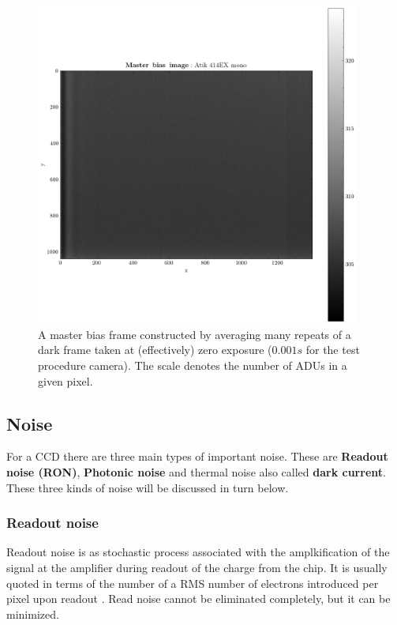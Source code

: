 \documentclass[../main.tex]{subfiles}
\begin{document}
	\begin{figure}[h!]
		\centering
		\includegraphics[width	=0.95\textwidth]{master_bias.png}
		\caption{A master bias frame constructed by averaging many repeats of a dark frame taken at (effectively) zero exposure ($0.001s$ for the test procedure camera). The scale denotes the number of ADUs in a given pixel.}
		\label{fig:masterbias}
	\end{figure}
	
	
	\subsection{Noise}
	For a CCD there are three main types of important noise. These are \textbf{Readout noise (RON)}, \textbf{Photonic noise} and thermal noise also called \textbf{dark current}. These three kinds of noise will be discussed in turn below. 
	
	\subsubsection{Readout noise}\label{ron}
	Readout noise is as stochastic process associated with the amplkification of the signal at the amplifier during readout of the charge from the chip. It is usually quoted in terms of the number of a RMS number of electrons introduced per pixel upon readout \cite{handbookofccdastronomy}. Read noise cannot be eliminated completely, but it can be minimized. 
	
\end{document}
